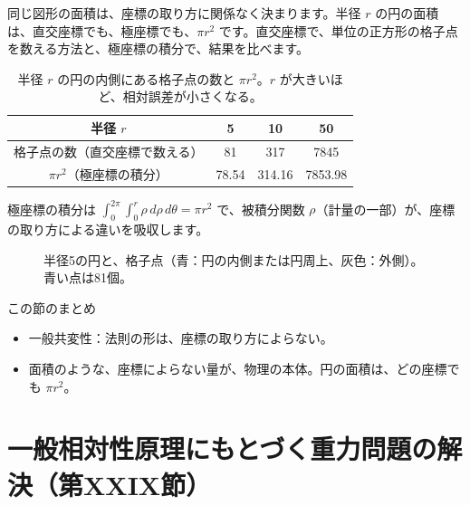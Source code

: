 \documentclass[a4paper,11pt,openany]{ltjsbook}
\begin{document}
同じ図形の面積は、座標の取り方に関係なく決まります。半径 $r$ の円の面積は、直交座標でも、極座標でも、$\pi r^2$ です。直交座標で、単位の正方形の格子点を数える方法と、極座標の積分で、結果を比べます。

\begin{table}[htbp]
\centering
\begin{tabular}{c|ccc}
\toprule
半径 $r$ & 5 & 10 & 50\\
\midrule
格子点の数（直交座標で数える） & 81 & 317 & 7845\\
$\pi r^2$（極座標の積分） & 78.54 & 314.16 & 7853.98\\
\bottomrule
\end{tabular}
\caption{半径 $r$ の円の内側にある格子点の数と $\pi r^2$。$r$ が大きいほど、相対誤差が小さくなる。}
\end{table}

極座標の積分は $\displaystyle\int_0^{2\pi}\!\!\int_0^r\rho\,d\rho\,d\theta=\pi r^2$ で、被積分関数 $\rho$（計量の一部）が、座標の取り方による違いを吸収します。

\begin{figure}[htbp]
\centering
{}
\caption{半径5の円と、格子点（青：円の内側または円周上、灰色：外側）。青い点は81個。}
\end{figure}

\begin{pointbox}{この節のまとめ}
\begin{itemize}[leftmargin=*]
\item 一般共変性：法則の形は、座標の取り方によらない。
\item 面積のような、座標によらない量が、物理の本体。円の面積は、どの座標でも $\pi r^2$。
\end{itemize}
\end{pointbox}

\chapter{一般相対性原理にもとづく重力問題の解決（第XXIX節）}
\end{document}
